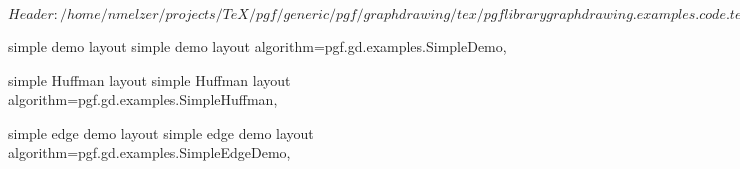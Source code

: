 %
%
%

\ProvidesFileRCS[v\pgfversion] $Header: /home/nmelzer/projects/TeX/pgf/generic/pgf/graphdrawing/tex/pgflibrarygraphdrawing.examples.code.tex,v 1.1 2012/05/14 10:27:48 tantau Exp $


%
%

\pgfgddeclarealgorithmkey
  {simple demo layout}
  {simple demo layout}
  {
    algorithm=pgf.gd.examples.SimpleDemo,
  }






%
%
%



\pgfgddeclarealgorithmkey
  {simple Huffman layout}
  {simple Huffman layout}
  {
    algorithm=pgf.gd.examples.SimpleHuffman,
  }


  
  
%
%


\pgfgddeclarealgorithmkey
  {simple edge demo layout}
  {simple edge demo layout}
  {
    algorithm=pgf.gd.examples.SimpleEdgeDemo,
  }



\endinput